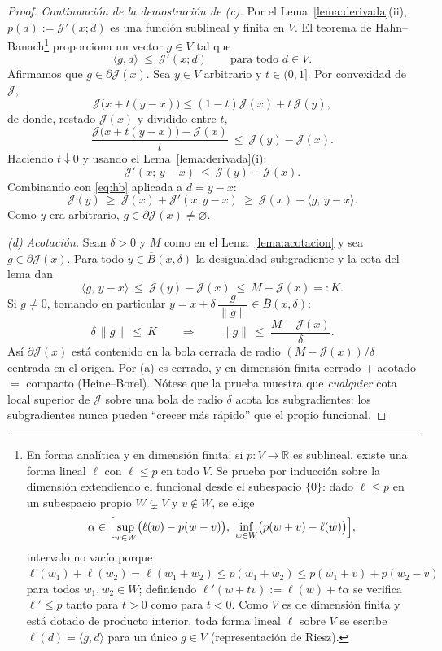 \documentclass[12pt]{book}
\theoremstyle{definition}
\theoremstyle{plain}
\theoremstyle{remark}
\begin{document}
\begin{proof}
\emph{Continuaci\'on de la demostraci\'on de (c).}
Por el Lema~\ref{lema:derivada}(ii), $p(d):=\mathcal{J}'(x;d)$ es una
funci\'on sublineal y finita en $V$. El teorema de
Hahn--Banach\footnote{En forma anal\'itica y en dimensi\'on finita: si
$p\colon V\to\mathbb{R}$ es sublineal, existe una forma lineal $\ell$
con $\ell\le p$ en todo $V$. Se prueba por inducci\'on sobre la
dimensi\'on extendiendo el funcional desde el subespacio $\{0\}$: dado
$\ell\le p$ en un subespacio propio $W\subsetneq V$ y $v\notin W$, se
elige
\[
\alpha\in\Bigl[\sup_{w\in W}\bigl(\ell(w)-p(w-v)\bigr),\ 
\inf_{w\in W}\bigl(p(w+v)-\ell(w)\bigr)\Bigr],
\]
intervalo no vac\'io porque $\ell(w_{1})+\ell(w_{2})
=\ell(w_{1}+w_{2})\le p(w_{1}+w_{2})\le p(w_{1}+v)+p(w_{2}-v)$ para
todos $w_{1},w_{2}\in W$; definiendo
$\ell'(w+tv):=\ell(w)+t\alpha$ se verifica $\ell'\le p$ tanto para
$t>0$ como para $t<0$. Como $V$ es de dimensi\'on finita y est\'a
dotado de producto interior, toda forma lineal $\ell$ sobre $V$ se
escribe $\ell(d)=\langle g,d\rangle$ para un \'unico $g\in V$
(representaci\'on de Riesz).}
proporciona un vector $g\in V$ tal que
\begin{equation}
\langle g,d\rangle\ \le\ \mathcal{J}'(x;d)
\qquad\text{para todo } d\in V.
\label{eq:hb}
\end{equation}
Afirmamos que $g\in\partial\mathcal{J}(x)$. Sea $y\in V$ arbitrario y
$t\in(0,1]$. Por convexidad de $\mathcal{J}$,
\[
\mathcal{J}\bigl(x+t(y-x)\bigr)
\le(1-t)\mathcal{J}(x)+t\,\mathcal{J}(y),
\]
de donde, restado $\mathcal{J}(x)$ y dividido entre $t$,
\[
\frac{\mathcal{J}\bigl(x+t(y-x)\bigr)-\mathcal{J}(x)}{t}
\ \le\ \mathcal{J}(y)-\mathcal{J}(x).
\]
Haciendo $t\downarrow0$ y usando el Lema~\ref{lema:derivada}(i):
\[
\mathcal{J}'(x;\,y-x)\ \le\ \mathcal{J}(y)-\mathcal{J}(x).
\]
Combinando con \eqref{eq:hb} aplicada a $d=y-x$:
\[
\mathcal{J}(y)\ \ge\
\mathcal{J}(x)+\mathcal{J}'(x;y-x)
\ \ge\ \mathcal{J}(x)+\langle g,\,y-x\rangle .
\]
Como $y$ era arbitrario, $g\in\partial\mathcal{J}(x)\neq\varnothing$.

\smallskip
\emph{(d) Acotaci\'on.}
Sean $\delta>0$ y $M$ como en el Lema~\ref{lema:acotacion} y sea
$g\in\partial\mathcal{J}(x)$. Para todo $y\in\overline{B}(x,\delta)$ la
desigualdad subgradiente y la cota del lema dan
\[
\langle g,\,y-x\rangle
\ \le\ \mathcal{J}(y)-\mathcal{J}(x)
\ \le\ M-\mathcal{J}(x)=:K.
\]
Si $g\neq0$, tomando en particular
$y=x+\delta\,\dfrac{g}{\|g\|}\in\overline{B}(x,\delta)$:
\[
\delta\,\|g\|\ \le\ K
\qquad\Longrightarrow\qquad
\|g\|\ \le\ \frac{M-\mathcal{J}(x)}{\delta}.
\]
As\'i $\partial\mathcal{J}(x)$ est\'a contenido en la bola cerrada de
radio $(M-\mathcal{J}(x))/\delta$ centrada en el origen. Por (a) es
cerrado, y en dimensi\'on finita cerrado + acotado $=$ compacto
(Heine--Borel). N\'otese que la prueba muestra que \emph{cualquier} cota
local superior de $\mathcal{J}$ sobre una bola de radio $\delta$ acota
los subgradientes: los subgradientes nunca pueden ``crecer m\'as
r\'apido'' que el propio funcional.
\end{proof}
\end{document}
